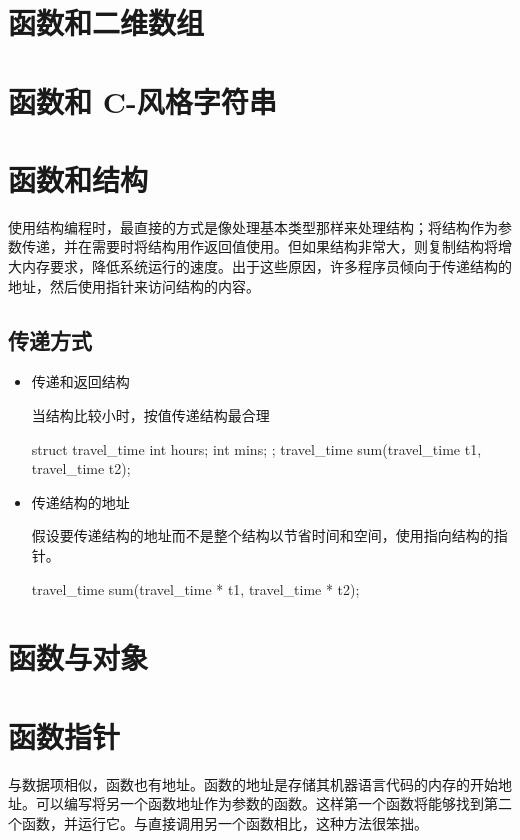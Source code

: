 \section{函数和二维数组}
\section{函数和 C-风格字符串}
\section{函数和结构}
使用结构编程时，最直接的方式是像处理基本类型那样来处理结构；将结构作为参数传递，并在需要时将结构用作返回值使用。但如果结构非常大，则复制结构将增大内存要求，降低系统运行的速度。出于这些原因，许多程序员倾向于传递结构的地址，然后使用指针来访问结构的内容。
\subsection{传递方式}
\begin{itemize}
	\setlength{\itemsep}{0pt}
	\setlength{\parsep}{0pt}
	\setlength{\parskip}{0pt}
	\item 传递和返回结构
	
	当结构比较小时，按值传递结构最合理
\begin{ccode}
struct travel_time
{
	int hours;
	int mins;		
};
travel_time sum(travel_time t1, travel_time t2);
\end{ccode}
	\item 传递结构的地址
	
	假设要传递结构的地址而不是整个结构以节省时间和空间，使用指向结构的指针。
\begin{ccode}
travel_time sum(travel_time * t1, travel_time * t2);
\end{ccode}
\end{itemize}
\section{函数与对象}
\section{函数指针}
与数据项相似，函数也有地址。函数的地址是存储其机器语言代码的内存的开始地址。可以编写将另一个函数地址作为参数的函数。这样第一个函数将能够找到第二个函数，并运行它。与直接调用另一个函数相比，这种方法很笨拙。
